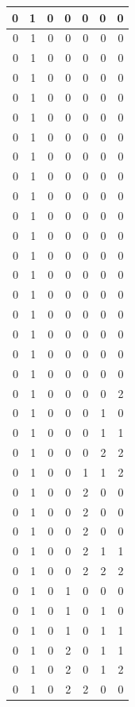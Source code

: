 \documentclass[
  12pt,
]{krantz}
\begin{document}
\begin{tabular}{r|r|r|r|r|r|r}
\hline
0 & 1 & 0 & 0 & 0 & 0 & 0\\
\hline
0 & 1 & 0 & 0 & 0 & 0 & 0\\
\hline
0 & 1 & 0 & 0 & 0 & 0 & 0\\
\hline
0 & 1 & 0 & 0 & 0 & 0 & 0\\
\hline
0 & 1 & 0 & 0 & 0 & 0 & 0\\
\hline
0 & 1 & 0 & 0 & 0 & 0 & 0\\
\hline
0 & 1 & 0 & 0 & 0 & 0 & 0\\
\hline
0 & 1 & 0 & 0 & 0 & 0 & 0\\
\hline
0 & 1 & 0 & 0 & 0 & 0 & 0\\
\hline
0 & 1 & 0 & 0 & 0 & 0 & 0\\
\hline
0 & 1 & 0 & 0 & 0 & 0 & 0\\
\hline
0 & 1 & 0 & 0 & 0 & 0 & 0\\
\hline
0 & 1 & 0 & 0 & 0 & 0 & 0\\
\hline
0 & 1 & 0 & 0 & 0 & 0 & 0\\
\hline
0 & 1 & 0 & 0 & 0 & 0 & 0\\
\hline
0 & 1 & 0 & 0 & 0 & 0 & 0\\
\hline
0 & 1 & 0 & 0 & 0 & 0 & 0\\
\hline
0 & 1 & 0 & 0 & 0 & 0 & 0\\
\hline
0 & 1 & 0 & 0 & 0 & 0 & 0\\
\hline
0 & 1 & 0 & 0 & 0 & 0 & 2\\
\hline
0 & 1 & 0 & 0 & 0 & 1 & 0\\
\hline
0 & 1 & 0 & 0 & 0 & 1 & 1\\
\hline
0 & 1 & 0 & 0 & 0 & 2 & 2\\
\hline
0 & 1 & 0 & 0 & 1 & 1 & 2\\
\hline
0 & 1 & 0 & 0 & 2 & 0 & 0\\
\hline
0 & 1 & 0 & 0 & 2 & 0 & 0\\
\hline
0 & 1 & 0 & 0 & 2 & 0 & 0\\
\hline
0 & 1 & 0 & 0 & 2 & 1 & 1\\
\hline
0 & 1 & 0 & 0 & 2 & 2 & 2\\
\hline
0 & 1 & 0 & 1 & 0 & 0 & 0\\
\hline
0 & 1 & 0 & 1 & 0 & 1 & 0\\
\hline
0 & 1 & 0 & 1 & 0 & 1 & 1\\
\hline
0 & 1 & 0 & 2 & 0 & 1 & 1\\
\hline
0 & 1 & 0 & 2 & 0 & 1 & 2\\
\hline
0 & 1 & 0 & 2 & 2 & 0 & 0\\

\end{tabular}
\end{document}
